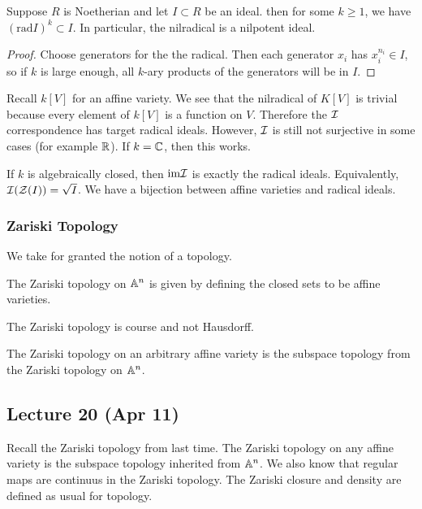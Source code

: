 \message{ !name(notes.tex)}\documentclass[10pt, twoside]{article}
\begin{document}
    \begin{prop}
        Suppose $R$ is Noetherian and let $I \subset R$ be an ideal. then for some $k \geq 1$, we have $(\mathrm{rad}I)^k \subset I$. In particular, the nilradical is a nilpotent ideal.
        \begin{proof}
            Choose generators for the the radical. Then each generator $x_i$ has $x_i^{n_i} \in I$, so if $k$ is large enough, all $k$-ary products of the generators will be in $I$.
        \end{proof}
    \end{prop}

    Recall $k[V]$ for an affine variety. We see that the nilradical of $K[V]$ is trivial because every element of $k[V]$ is a function on $V$. Therefore the $\mathcal{I}$ correspondence has target radical ideals. However, $\mathcal{I}$ is still not surjective in some cases (for example $\mathbb{R}$). If $k = \mathbb{C}$, then this works.

    \begin{thm}[Nullstellensatz]
        If $k$ is algebraically closed, then $\mathrm{im} \mathcal{I}$ is exactly the radical ideals. Equivalently, $\mathcal{I}(\mathcal{Z}(I)) = \sqrt{I}$. We have a bijection between affine varieties and radical ideals.
    \end{thm}

    \subsubsection{Zariski Topology}
    We take for granted the notion of a topology. 

    \begin{defn}
        The Zariski topology on $\mathbb{A}^n$ is given by defining the closed sets to be affine varieties.
    \end{defn}
    \begin{rmk}
        The Zariski topology is course and not Hausdorff.
    \end{rmk}
    \begin{rmk}
        The Zariski topology on an arbitrary affine variety is the subspace topology from the Zariski topology on $\mathbb{A}^n$.
    \end{rmk}
       
        \subsection{Lecture 20 (Apr 11)}
        Recall the Zariski topology from last time. The Zariski topology on any affine variety is the subspace topology inherited from $\mathbb{A}^n$. We also know that regular maps are continuus in the Zariski topology. The Zariski closure and density are defined as usual for topology.
\end{document}
